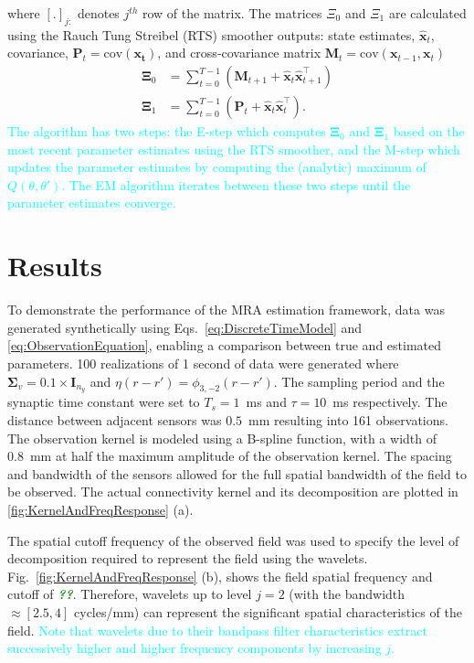 \documentclass[journal,a4paper]{IEEEtran}
\newcommand{\dean}[1]{\textsf{\emph{\textbf{\textcolor{green}{#1}}}}}
\newcommand{\cut}[1]{\textcolor{cyan}{#1}}
\begin{document}
where $[.]_{j:} $ denotes $j^{th}$ row of the matrix. The matrices $\Xi_0$ and $\Xi_1$ are calculated using the Rauch Tung Streibel (RTS)\cite{RAUCH1965} smoother outputs: state estimates, $\hat{\mathbf x}_t$, covariance, $\mathbf P_t=\mathrm{cov}(\mathbf{x_t})$, and cross-covariance matrix $\mathbf M_t=\mathrm{cov}(\mathbf{x}_{t-1},\mathbf{x}_{t})$ 
\begin{align}\label{eq:Xivariables}
\boldsymbol\Xi_0&=\sum_{t=0}^{T-1}\left(\mathbf M_{t+1}+\mathbf{\hat x}_t\mathbf{\hat x}_{t+1}^\top\right) \\
 \boldsymbol\Xi_1&=\sum_{t=0}^{T-1}\left(\mathbf P_t+\mathbf{\hat x}_t\mathbf{\hat x}_t^\top\right).
\end{align}
 \cut{The algorithm has two steps: the E-step which computes $\boldsymbol\Xi_0$ and $\boldsymbol\Xi_1$ based on the most recent parameter estimates using the RTS smoother, and the M-step which updates the parameter estimates by computing the (analytic) maximum of $Q(\theta,\theta')$. The EM algorithm iterates between these two steps until the parameter estimates converge.} 

\section{Results}
To demonstrate the performance of the MRA estimation framework, data was generated synthetically  using Eqs.~\ref{eq:DiscreteTimeModel} and \ref{eq:ObservationEquation}, enabling a comparison between true and estimated parameters. 100 realizations of 1 second of data were generated where $\boldsymbol\Sigma_v=0.1 \times \mathbf{I}_{n_y}$ and $\eta(r-r')=\phi_{3,-2}(r-r')$. The sampling period and the synaptic time constant were set to $T_s = 1$~ms and $\tau = 10$~ms respectively. The distance between adjacent sensors was $0.5$~mm resulting into 161 observations. The observation kernel is modeled using a B-spline function, with a width of 0.8~mm at half the maximum amplitude of the observation kernel. The spacing and bandwidth of the sensors allowed for the full spatial bandwidth of the field to be observed. The actual connectivity kernel and its decomposition are plotted in \figurename{\ref{fig:KernelAndFreqResponse}} (a). 

The spatial cutoff frequency of the observed field was used to specify the level of decomposition required to represent the field using the wavelets. Fig.~\ref{fig:KernelAndFreqResponse} (b), shows the field spatial frequency and cutoff of \dean{??}. Therefore, wavelets up to level $j=2$ (with the bandwidth $\approx[2.5,4]$ cycles/mm) can represent the significant spatial characteristics of the field. \cut{Note that wavelets due to their bandpass filter characteristics extract successively higher and higher frequency components by increasing $j$.}
\end{document}
